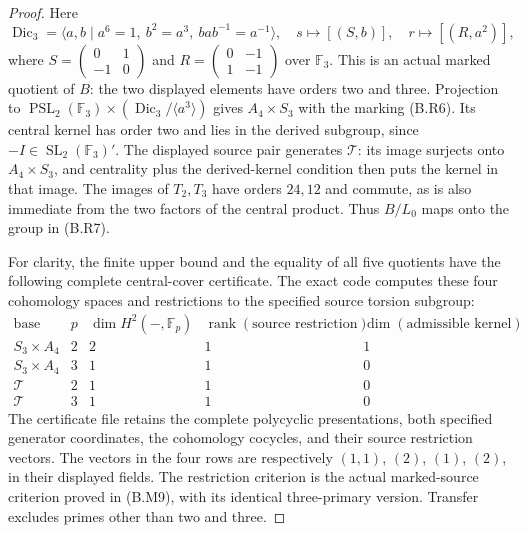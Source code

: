\begin{proof}
Here
\[
 \operatorname{Dic}_3=
 \langle a,b\mid a^6=1,\ b^2=a^3,\ bab^{-1}=a^{-1}\rangle,
 \quad
 s\longmapsto[(S,b)],\quad r\longmapsto[(R,a^2)],
\]
where
$S=\left(\begin{smallmatrix}0&1\\-1&0\end{smallmatrix}\right)$
and
$R=\left(\begin{smallmatrix}0&-1\\1&-1\end{smallmatrix}\right)$
over $\mathbb F_3$.  This is an actual marked quotient of
$B$: the two displayed elements have orders two and three.
Projection to $\operatorname{PSL}_2(\mathbb F_3)\times
(\operatorname{Dic}_3/\langle a^3\rangle)$ gives
$A_4\times S_3$ with the marking (B.R6).  Its central kernel
has order two and lies in the derived subgroup, since
$-I\in\operatorname{SL}_2(\mathbb F_3)'$.  The displayed
source pair generates $\mathcal T$: its image surjects onto
$A_4\times S_3$, and centrality plus the derived-kernel
condition then puts the kernel in that image.  The images
of $T_2,T_3$ have orders $24,12$ and commute, as is also
immediate from the two factors of the central product.
Thus $B/L_0$ maps onto the group in (B.R7).

For clarity, the finite upper bound and the equality of all
five quotients have the following complete central-cover
certificate.  The exact code
 computes these four
cohomology spaces and restrictions to the specified source
torsion subgroup:
\[
\begin{array}{c|c|c|c|c}
 \text{base}&p&\dim H^2(-,\mathbb F_p)&
 \operatorname{rank}(\text{source restriction})&
 \dim(\text{admissible kernel})\\\hline
 S_3\times A_4&2&2&1&1\\
 S_3\times A_4&3&1&1&0\\
 \mathcal T&2&1&1&0\\
 \mathcal T&3&1&1&0
\end{array}                                                     \tag{B.R8}
\]
The certificate file retains the complete polycyclic
presentations, both specified generator coordinates, the
cohomology cocycles, and their source restriction vectors.
The vectors in the four rows are respectively
$(1,1)$, $(2)$, $(1)$, $(2)$, in their displayed fields.
The restriction criterion is the actual marked-source
criterion proved in (B.M9), with its identical three-primary
version.  Transfer excludes primes other than two and three.


\end{proof}
